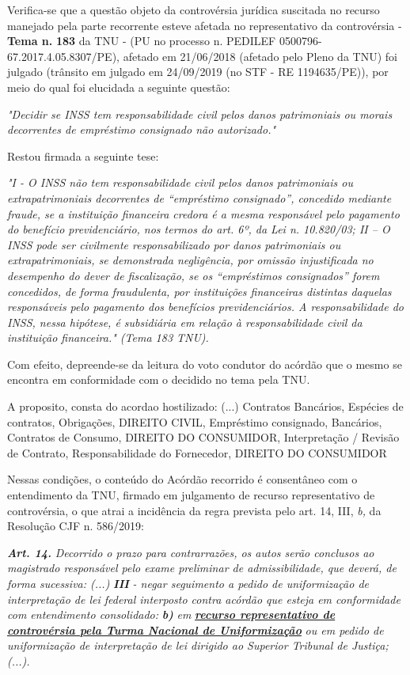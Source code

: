 \documentclass[12pt]{article}
\begin{document}
\justifying
\noindent Verifica-se que a questão objeto da controvérsia jurídica suscitada no recurso manejado pela parte recorrente esteve afetada no representativo da controvérsia - \textbf{Tema n. }\textbf{183} da TNU - (PU no processo n. PEDILEF 0500796-67.2017.4.05.8307/PE),  afetado em 21/06/2018 (afetado pelo Pleno da TNU) foi julgado (trânsito em julgado em 24/09/2019 (no STF - RE 1194635/PE)), por meio do qual foi elucidada a seguinte questão:

\noindent \textit{"Decidir se INSS tem responsabilidade civil pelos danos patrimoniais ou morais decorrentes de empréstimo consignado não autorizado."}

\noindent Restou firmada a seguinte tese:

\noindent \textit{"I - O INSS não tem responsabilidade civil pelos danos patrimoniais ou extrapatrimoniais decorrentes de “empréstimo consignado”, concedido mediante fraude, se a instituição financeira credora é a mesma responsável pelo pagamento do benefício previdenciário, nos termos do art. 6º, da Lei n. 10.820/03; II – O INSS pode ser civilmente responsabilizado por danos patrimoniais ou extrapatrimoniais, se demonstrada negligência, por omissão injustificada no desempenho do dever de fiscalização, se os “empréstimos consignados” forem concedidos, de forma fraudulenta, por instituições financeiras distintas daquelas responsáveis pelo pagamento dos benefícios previdenciários. A responsabilidade do INSS, nessa hipótese, é subsidiária em relação à responsabilidade civil da instituição financeira." (Tema 183 TNU).}

\noindent Com efeito, depreende-se da leitura do voto condutor do acórdão que o mesmo se encontra em conformidade com o decidido no  tema pela TNU.

\noindent A proposito, consta do acordao hostilizado: (...) Contratos Bancários, Espécies de contratos, Obrigações, DIREITO CIVIL, Empréstimo consignado, Bancários, Contratos de Consumo, DIREITO DO CONSUMIDOR, Interpretação / Revisão de Contrato, Responsabilidade do Fornecedor, DIREITO DO CONSUMIDOR

\noindent Nessas condições, o conteúdo do Acórdão recorrido é consentâneo com o entendimento da TNU, firmado em julgamento de recurso representativo de controvérsia, o que atrai a incidência da regra prevista pelo art. 14, III, \textit{b,} da Resolução CJF n. 586/2019:

\noindent \textit{\textbf{Art. 14.}}\textit{ Decorrido o prazo para contrarrazões, os autos serão conclusos ao magistrado responsável pelo exame preliminar de admissibilidade, que deverá, de forma sucessiva: (...) }\textit{\textbf{III }}\textit{- negar seguimento a pedido de uniformização de interpretação de lei federal interposto contra acórdão que esteja em conformidade com entendimento consolidado: }\textit{\textbf{b)}}\textit{ em }\uline{\textit{\textbf{recurso representativo de controvérsia pela Turma Nacional de Uniformização}}}\textit{ ou em pedido de uniformização de interpretação de lei dirigido ao Superior Tribunal de Justiça;(...).}
\end{document}
